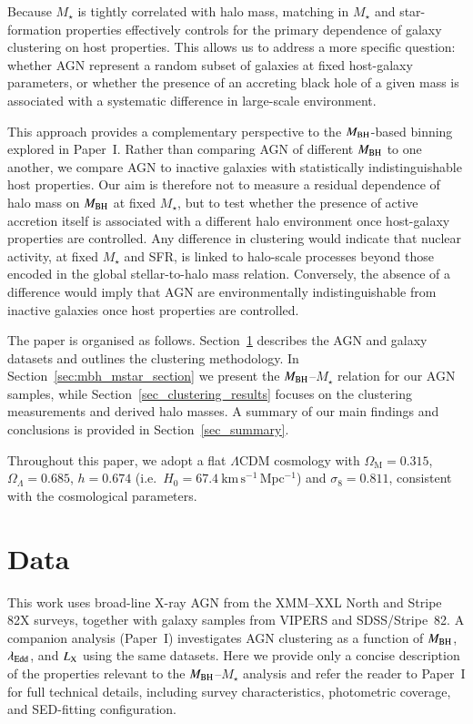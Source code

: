 \documentclass{aa}
\begin{document}
Because $M_\star$ is tightly correlated with halo mass, matching in $M_\star$ and star-formation properties effectively controls for the primary dependence of galaxy clustering on host properties. This allows us to address a more specific question: whether AGN represent a random subset of galaxies at fixed host-galaxy parameters, or whether the presence of an accreting black hole of a given mass is associated with a systematic difference in large-scale environment.

This approach provides a complementary perspective to the $M_{\rm BH}$-based binning explored in Paper~I. Rather than comparing AGN of different $M_{\rm BH}$ to one another, we compare AGN to inactive galaxies with statistically indistinguishable host properties. Our aim is therefore not to measure a residual dependence of halo mass on $M_{\rm BH}$ at fixed $M_\star$, but to test whether the presence of active accretion itself is associated with a different halo environment once host-galaxy properties are controlled. Any difference in clustering would indicate that nuclear activity, at fixed $M_\star$ and SFR, is linked to halo-scale processes beyond those encoded in the global stellar-to-halo mass relation. Conversely, the absence of a difference would imply that AGN are environmentally indistinguishable from inactive galaxies once host properties are controlled.

The paper is organised as follows. Section~\ref{sec_data} describes the AGN and
galaxy datasets and outlines the clustering methodology. In
Section~\ref{sec:mbh_mstar_section} we present the $M_{\rm BH}$--$M_\star$
relation for our AGN samples, while Section~\ref{sec_clustering_results}
focuses on the clustering measurements and derived halo masses. A summary of our
main findings and conclusions is provided in Section~\ref{sec_summary}.

Throughout this paper, we adopt a flat $\Lambda$CDM cosmology with 
$\Omega_{\mathrm{M}}=0.315$, $\Omega_{\Lambda}=0.685$, $h=0.674$ (i.e.\ $H_0 = 67.4~\mathrm{km\,s^{-1}\,Mpc^{-1}}$) and $\sigma_8 = 0.811$,  
consistent with the \citet{Planck2020} cosmological parameters.

\section{Data}
\label{sec_data}

This work uses broad-line X-ray AGN from the XMM--XXL North and Stripe 82X surveys, together with galaxy samples from VIPERS and SDSS/Stripe~82.  
A companion analysis (Paper~I) investigates AGN clustering as a function of $M_{\rm BH}$, $\lambda_{\rm Edd}$, and $L_{\rm X}$ using the same datasets.  
Here we provide only a concise description of the properties relevant to the $M_{\rm BH}$--$M_\star$ analysis and refer the reader to Paper~I for full technical details, including survey characteristics, photometric coverage, and SED-fitting configuration.
\end{document}
